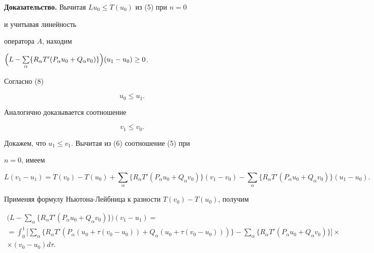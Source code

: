 {\bf Доказательство.} Вычитая $Lu_0\le T(u_0)$ из (5) при $n=0$


и учитывая линейность


оператора $A$, находим


$\Bigl(L-\sum\limits_\alpha\{R_\alpha T'(P_\alpha u_0+Q_\alpha v_0)\}


\Bigr)(u_1-u_0)\ge 0$.


Согласно (8)


\begin{equation}


u_0\le u_1.


\end{equation}


Аналогично доказывается соотношение


\begin{equation}


v_1\le v_0.


\end{equation}





Докажем, что $u_1\le v_1$. Вычитая из (6) соотношение (5) при


$n=0$, имеем


$$


L(v_1-u_1)=T(v_0)-T(u_0)+\sum_\alpha


\{R_\alpha T'(P_\alpha u_0+Q_\alpha v_0)\}(v_1-v_0)-


\sum_\alpha\{R_\alpha T'(P_\alpha u_0+Q_\alpha v_0)\}


(u_1-u_0).


$$


Применяя формулу Ньютона-Лейбница к разности $T(v_0)-T(u_0)$, получим


\begin{gather*}


\biggl(L-\sum_\alpha\{R_\alpha T'(P_\alpha u_0+Q_\alpha v_0)\}\biggr)


(v_1-u_1)= \\


=\int^1_0\biggl[\sum_\alpha\{R_\alpha T'(P_\alpha(u_0+\tau


(v_0-u_0))+Q_\alpha(u_0+\tau(v_0-u_0)))\}-


\sum_\alpha\{R_\alpha T'(P_\alpha u_0+Q_\alpha v_0)\}\biggr]\times \\


\times (v_0-u_0)d\tau.


\end{gather*}


